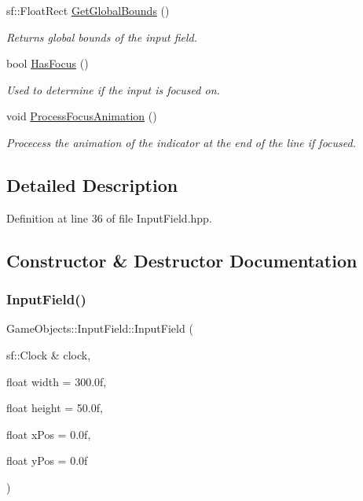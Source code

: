 \begin{DoxyCompactItemize}
sf\+::\+Float\+Rect \mbox{\hyperlink{class_game_objects_1_1_input_field_af629e9c792ccfdcc64ab807b9b30a5ac}{Get\+Global\+Bounds}} ()
\begin{DoxyCompactList}\small\item\em Returns global bounds of the input field. \end{DoxyCompactList}\item 
bool \mbox{\hyperlink{class_game_objects_1_1_input_field_a2d50c951daa79d6afdf47b6afb0d7c3f}{Has\+Focus}} ()
\begin{DoxyCompactList}\small\item\em Used to determine if the input is focused on. \end{DoxyCompactList}\item 
void \mbox{\hyperlink{class_game_objects_1_1_input_field_adc1c1e00c8114cdf5278fff4ae070076}{Process\+Focus\+Animation}} ()
\begin{DoxyCompactList}\small\item\em Procecess the animation of the indicator at the end of the line if focused. \end{DoxyCompactList}\end{DoxyCompactItemize}


\subsection{Detailed Description}


Definition at line 36 of file Input\+Field.\+hpp.



\subsection{Constructor \& Destructor Documentation}
\mbox{\label{class_game_objects_1_1_input_field_a0a054047baaacb3610868aff6e111453}} 
\subsubsection{\texorpdfstring{InputField()}{InputField()}\hspace{0.1cm}{\footnotesize\ttfamily [1/2]}}
{\footnotesize\ttfamily Game\+Objects\+::\+Input\+Field\+::\+Input\+Field (\begin{DoxyParamCaption}\item[{sf\+::\+Clock \&}]{clock,  }\item[{float}]{width = {\ttfamily 300.0f},  }\item[{float}]{height = {\ttfamily 50.0f},  }\item[{float}]{x\+Pos = {\ttfamily 0.0f},  }\item[{float}]{y\+Pos = {\ttfamily 0.0f} }\end{DoxyParamCaption})}



